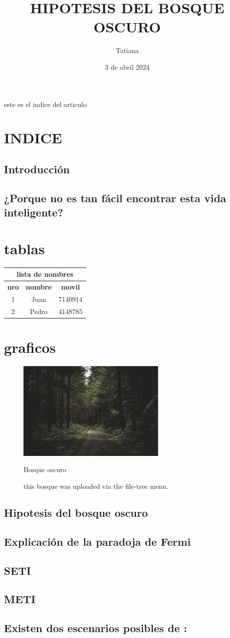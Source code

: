 \documentclass[12pt]{article}
\title{HIPOTESIS DEL BOSQUE OSCURO}
\author{Tatiana}
\date{3 de abril 2024}
\begin{document}
\tableofcontents
\maketitle
\noindent
este es el indice del articulo
\section{INDICE}
\subsection{Introducción}
\lipsum[1-2]
\subsection{¿Porque no es tan fácil encontrar esta vida inteligente?}
\lipsum[1]
\section{tablas}
\begin{center}
\begin{tabular}{|c|c|c|}
\hline
\multicolumn{3}{c}{lista de nombres}\\
\hline
\hline
\color{red}
\bf nro & \color{red}\bf nombre & \color{red}\bf movil \\
   \hline
    1  &  Juan  & 7140914\\
    \hline
    2  &  Pedro & 4148785\\
    \hline
\end{tabular}
\end{center}
\section{graficos}
\begin{figure}
    \centering
    \includegraphics[width=0.45\linewidth]{bosqueblack.jpeg}
    \caption{\label{bosqueblack.jpeg}this bosque was uploaded via the file-tree menu.}{Bosque oscuro}
    \label{fig:enter-label}
\end{figure}
\subsection{Hipotesis del bosque oscuro}
\lipsum[1-5]
\subsection{Explicación de la paradoja de Fermi}
\lipsum[1-2]
\subsection{SETI}
\lipsum[1-2]
\subsection{METI}
\lipsum[1-2]
\subsection{Existen dos escenarios posibles de :}
\lipsum[1-3]
\end{document}
